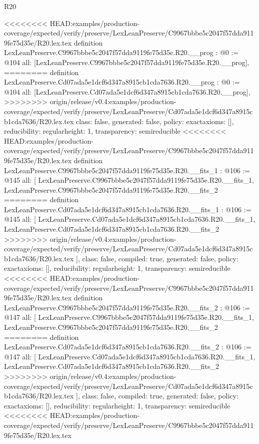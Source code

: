 \begin{lexlean}{R20}
\begin{coremodule}
<<<<<<<< HEAD:examples/production-coverage/expected/verify/preserve/LexLeanPreserve/C9967bbbe5c2047f57dda9119fe75d35e/R20.lex.tex
definition LexLeanPreserve.C9967bbbe5c2047f57dda9119fe75d35e.R20.__prog : @0 := @104 {
  all: [LexLeanPreserve.C9967bbbe5c2047f57dda9119fe75d35e.R20.__prog],
========
definition LexLeanPreserve.Cd07ada5e1dcf6d347a8915cb1cda7636.R20.__prog : @0 := @104 {
  all: [LexLeanPreserve.Cd07ada5e1dcf6d347a8915cb1cda7636.R20.__prog],
>>>>>>>> origin/release/v0.4:examples/production-coverage/expected/verify/preserve/LexLeanPreserve/Cd07ada5e1dcf6d347a8915cb1cda7636/R20.lex.tex
  class: false,
  generated: false,
  policy: exact{axioms: []},
  reducibility: regular{height: 1},
  transparency: semireducible
}
<<<<<<<< HEAD:examples/production-coverage/expected/verify/preserve/LexLeanPreserve/C9967bbbe5c2047f57dda9119fe75d35e/R20.lex.tex
definition LexLeanPreserve.C9967bbbe5c2047f57dda9119fe75d35e.R20.__fits_1 : @106 := @145 {
  all: [
    LexLeanPreserve.C9967bbbe5c2047f57dda9119fe75d35e.R20.__fits_1,
    LexLeanPreserve.C9967bbbe5c2047f57dda9119fe75d35e.R20.__fits_2
========
definition LexLeanPreserve.Cd07ada5e1dcf6d347a8915cb1cda7636.R20.__fits_1 : @106 := @145 {
  all: [
    LexLeanPreserve.Cd07ada5e1dcf6d347a8915cb1cda7636.R20.__fits_1,
    LexLeanPreserve.Cd07ada5e1dcf6d347a8915cb1cda7636.R20.__fits_2
>>>>>>>> origin/release/v0.4:examples/production-coverage/expected/verify/preserve/LexLeanPreserve/Cd07ada5e1dcf6d347a8915cb1cda7636/R20.lex.tex
  ],
  class: false,
  compiled: true,
  generated: false,
  policy: exact{axioms: []},
  reducibility: regular{height: 1},
  transparency: semireducible
}
<<<<<<<< HEAD:examples/production-coverage/expected/verify/preserve/LexLeanPreserve/C9967bbbe5c2047f57dda9119fe75d35e/R20.lex.tex
definition LexLeanPreserve.C9967bbbe5c2047f57dda9119fe75d35e.R20.__fits_2 : @106 := @147 {
  all: [
    LexLeanPreserve.C9967bbbe5c2047f57dda9119fe75d35e.R20.__fits_1,
    LexLeanPreserve.C9967bbbe5c2047f57dda9119fe75d35e.R20.__fits_2
========
definition LexLeanPreserve.Cd07ada5e1dcf6d347a8915cb1cda7636.R20.__fits_2 : @106 := @147 {
  all: [
    LexLeanPreserve.Cd07ada5e1dcf6d347a8915cb1cda7636.R20.__fits_1,
    LexLeanPreserve.Cd07ada5e1dcf6d347a8915cb1cda7636.R20.__fits_2
>>>>>>>> origin/release/v0.4:examples/production-coverage/expected/verify/preserve/LexLeanPreserve/Cd07ada5e1dcf6d347a8915cb1cda7636/R20.lex.tex
  ],
  class: false,
  compiled: true,
  generated: false,
  policy: exact{axioms: []},
  reducibility: regular{height: 1},
  transparency: semireducible
}
<<<<<<<< HEAD:examples/production-coverage/expected/verify/preserve/LexLeanPreserve/C9967bbbe5c2047f57dda9119fe75d35e/R20.lex.tex
}}}
\end{coremodule}
\end{lexlean}
